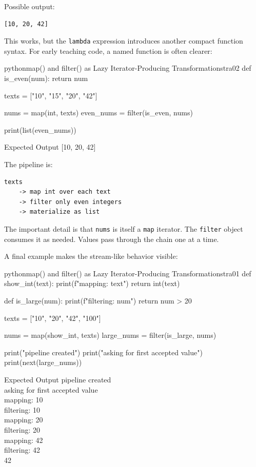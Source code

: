 \documentclass[a4paper,twoside]{report}
\begin{document}
Possible output:

\begin{verbatim}
[10, 20, 42]
\end{verbatim}

This works, but the \texttt{lambda} expression introduces another compact function syntax. For early teaching code, a named function is often clearer:

\begin{codebox}[]{python}{map() and filter() as Lazy Iterator-Producing Transformations}{tra02}
def is_even(num):
    return num %

texts = ["10", "15", "20", "42"]

nums = map(int, texts)
even_nums = filter(is_even, nums)

print(list(even_nums))
\end{codebox}


\begin{iobox}{Expected Output}
[10, 20, 42] \\
\end{iobox}




The pipeline is:

\begin{verbatim}
texts
    -> map int over each text
    -> filter only even integers
    -> materialize as list
\end{verbatim}

The important detail is that \texttt{nums} is itself a \texttt{map} iterator. The \texttt{filter} object consumes it as needed. Values pass through the chain one at a time.

A final example makes the stream-like behavior visible:

\begin{codebox}[]{python}{map() and filter() as Lazy Iterator-Producing Transformations}{tra01}
def show_int(text):
    print(f"mapping: {text}")
    return int(text)

def is_large(num):
    print(f"filtering: {num}")
    return num > 20

texts = ["10", "20", "42", "100"]

nums = map(show_int, texts)
large_nums = filter(is_large, nums)

print("pipeline created")
print("asking for first accepted value")
print(next(large_nums))
\end{codebox}


\begin{iobox}{Expected Output}
pipeline created \\
asking for first accepted value \\
mapping: 10 \\
filtering: 10 \\
mapping: 20 \\
filtering: 20 \\
mapping: 42 \\
filtering: 42 \\
42 \\
\end{iobox}
\end{document}

